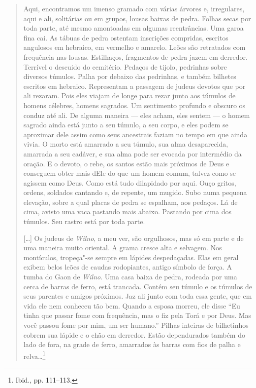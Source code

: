 %
\begin{quote}
Aqui, encontramos um imenso gramado com várias árvores e, irregulares,
aqui e ali, solitárias ou em grupos, lousas baixas de pedra. Folhas
secas por toda parte, até mesmo amontoadas em algumas reentrâncias. Uma
garoa fina cai. As tábuas de pedra ostentam inscrições compridas,
escritos angulosos em hebraico, em vermelho e amarelo. Leões são
retratados com frequência nas lousas. Estilhaços, fragmentos de pedra
jazem em derredor. Terrível o descuido do cemitério. Pedaços de tijolo,
pedrinhas sobre diversos túmulos. Palha por debaixo das pedrinhas, e
também bilhetes escritos em hebraico. Representam a passagem de judeus
devotos que por ali rezaram. Pois eles viajam de longe para rezar junto
aos túmulos de homens célebres, homens sagrados. Um sentimento profundo
e obscuro os conduz até ali. De alguma maneira --- eles acham, eles sentem
--- o homem sagrado ainda está junto a seu túmulo, a seu corpo, e eles
podem se aproximar dele assim como seus ancestrais faziam no tempo em
que ainda vivia. O morto está amarrado a seu túmulo, sua alma
desaparecida, amarrada a seu cadáver, e sua alma pode ser evocada por
intermédio da oração. E o devoto, o rebe, os santos estão mais próximos
de Deus e conseguem obter mais dEle do que um homem comum, talvez como
se agissem como Deus. Como está tudo dilapidado por aqui. Ouço gritos,
ordens, soldados cantando e, de repente, um mugido. Subo numa pequena
elevação, sobre a qual placas de pedra se espalham, aos pedaços. Lá de
cima, avisto uma vaca pastando mais abaixo. Pastando por cima dos
túmulos. Seu rastro está por toda parte.

[\ldots{}] Os judeus de \textit{Wilno}, a meu ver, são orgulhosos, mas só em parte
e de uma maneira muito oriental. A grama cresce alta e selvagem. Nos
montículos, tropeça"-se sempre em lápides despedaçadas. Elas em geral
exibem belos leões de caudas rodopiantes, antigo símbolo de força. A
tumba do Gaon de \textit{Wilno}. Uma casa baixa de pedra, rodeada por uma cerca
de barras de ferro, está trancada. Contém seu túmulo e os túmulos de
seus parentes e amigos próximos. Jaz ali junto com toda essa gente, que
em vida ele nem conheceu tão bem. Quando a esposa morreu, ele disse ``Eu
tinha que passar fome com frequência, mas o fiz pela Torá e por Deus.
Mas você passou fome por mim, um ser humano.'' Pilhas inteiras de
bilhetinhos cobrem sua lápide e o chão em derredor. Estão dependurados
também do lado de fora, na grade de ferro, amarrados às barras com fios
de palha e relva\ldots{}\footnote{Ibid., pp. 111--113.}
\end{quote}

